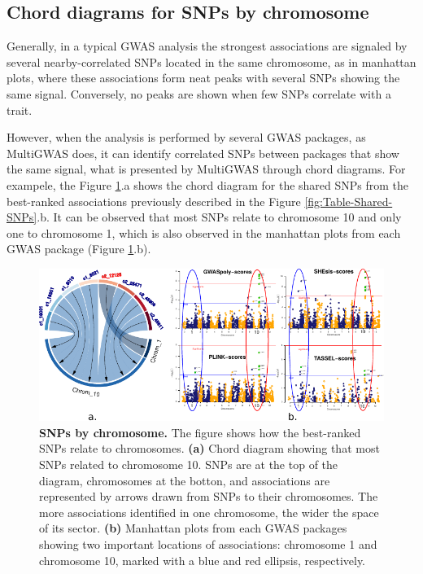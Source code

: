 \documentclass{article}
\begin{document}
\subsection{Chord diagrams for SNPs by chromosome}

Generally, in a typical GWAS analysis the strongest associations are
signaled by several nearby-correlated SNPs located in the same chromosome,
as in manhattan plots, where these associations form neat peaks with
several SNPs showing the same signal. Conversely, no peaks are shown
when few SNPs correlate with a trait. 

However, when the analysis is performed by several GWAS packages,
as MultiGWAS does, it can identify correlated SNPs between packages
that show the same signal, what is presented by MultiGWAS through
chord diagrams. For exampele, the Figure \ref{fig:Chord-diagrams}.a
shows the chord diagram for the shared SNPs from the best-ranked associations
previously described in the Figure \ref{fig:Table-Shared-SNPs}.b.
It can be observed that most SNPs relate to chromosome 10 and only
one to chromosome 1, which is also observed in the manhattan plots
from each GWAS package (Figure \ref{fig:Chord-diagrams}.b).

\begin{figure}
\begin{centering}
\includegraphics{images/paper-chord-manhattans}
\par\end{centering}
\caption{\textbf{SNPs by chromosome.} The figure shows how the best-ranked
SNPs relate to chromosomes. \textbf{(a)} Chord diagram showing that
most SNPs related to chromosome 10. SNPs are at the top of the diagram,
chromosomes at the botton, and associations are represented by arrows
drawn from SNPs to their chromosomes. The more associations identified
in one chromosome, the wider the space of its sector. \textbf{(b)}
Manhattan plots from each GWAS packages showing two important locations
of associations: chromosome 1 and chromosome 10, marked with a blue
and red ellipsis, respectively. \label{fig:Chord-diagrams}}

\end{figure}
\end{document}
